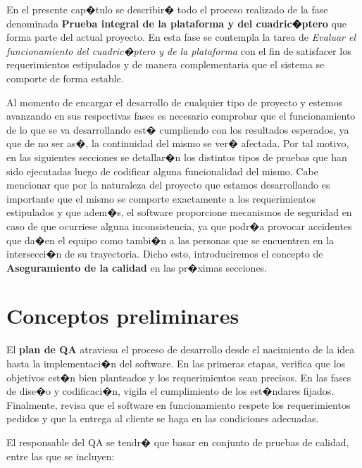 \begin{resumen}
	En el presente cap�tulo se describir� todo el proceso realizado de la fase denominada \textbf{ Prueba integral de la plataforma y del cuadric�ptero} que forma parte del actual proyecto. En esta fase se contempla la tarea de \textit{Evaluar el funcionamiento del cuadric�ptero y de la plataforma} con el fin de satisfacer los requerimientos estipulados y de manera complementaria que el sistema se comporte de forma estable. 

\par Al momento de encargar el desarrollo de cualquier tipo de proyecto y estemos avanzando en sus respectivas fases es necesario comprobar que el funcionamiento de lo que se va desarrollando est� cumpliendo con los resultados esperados, ya que de no ser as�, la continuidad del mismo se ver� afectada. Por tal motivo, en las siguientes secciones se detallar�n los distintos tipos de pruebas que han sido ejecutadas luego de codificar alguna funcionalidad del mismo. Cabe mencionar que por la naturaleza del proyecto que estamos desarrollando es importante que el mismo se comporte exactamente a los requerimientos estipulados y que adem�s, el software proporcione mecanismos de seguridad en caso de que ocurriese alguna inconsistencia, ya que podr�a provocar accidentes que da�en el equipo como tambi�n a las personas que se encuentren en la intersecci�n de su trayectoria. Dicho esto, introduciremos el concepto de  \textbf{Aseguramiento de la calidad} en las pr�ximas secciones. 

\end{resumen}


\section{Conceptos preliminares}

El\textbf{ plan de QA} atraviesa el proceso de desarrollo desde el nacimiento de la idea hasta la implementaci�n del software.  En las primeras etapas, verifica que los objetivos est�n bien planteados y los requerimientos sean precisos. En las fases de dise�o y codificaci�n, vigila el cumplimiento de los est�ndares fijados. Finalmente, revisa que el software en funcionamiento respete los requerimientos pedidos y que la entrega al cliente se haga en las condiciones adecuadas.

El responsable del QA se tendr� que basar en conjunto de pruebas de calidad, entre las que se incluyen:

